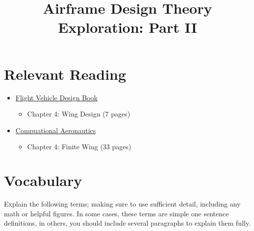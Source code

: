 \documentclass[11pt]{article}
\title{Airframe Design Theory Exploration: Part II}
\date{}
\begin{document}
	
\maketitle
\vspace{-2cm}
	
\section*{Relevant Reading}
\label{sec:reading}

\begin{itemize}
	\item \href{http://flowlab.groups.et.byu.net/me415/flight.pdf}{Flight Vehicle Design Book}
	\begin{itemize}
		\item Chapter 4: Wing Design (7 pages)
	\end{itemize}
	\item \href{https://byu.box.com/shared/static/ywfayozbj3sr2ot6b32u8nqk5brqvurt.pdf}{Compuational Aeronautics}
	\begin{itemize}
		\item Chapter 4: Finite Wing (33 pages)
	\end{itemize}
\end{itemize}




\section{Vocabulary}
\label{sec:vocab}

Explain the following terms; making sure to use sufficient detail, including any math or helpful figures.
In some cases, these terms are simple one sentence definitions, in others, you should include several paragraphs to explain them fully.
\end{document}
